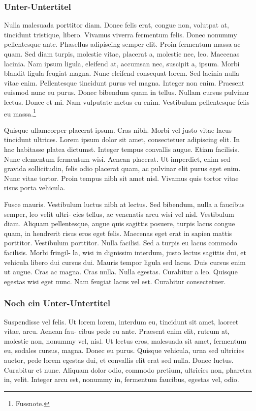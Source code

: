 \documentclass[ngerman]{uzhpub}
\begin{document}
\subsubsection{Unter-Untertitel}

Nulla malesuada porttitor diam. Donec felis erat, congue non, volutpat
at, tincidunt tristique, libero. Vivamus viverra fermentum felis.
Donec nonummy pellentesque ante. Phasellus adipiscing semper elit.
Proin fermentum massa ac quam. Sed diam turpis, molestie vitae, placerat
a, molestie nec, leo. Maecenas lacinia. Nam ipsum ligula, eleifend
at, accumsan nec, suscipit a, ipsum. Morbi blandit ligula feugiat
magna. Nunc eleifend consequat lorem. Sed lacinia nulla vitae enim.
Pellentesque tincidunt purus vel magna. Integer non enim. Praesent
euismod nunc eu purus. Donec bibendum quam in tellus. Nullam cursus
pulvinar lectus. Donec et mi. Nam vulputate metus eu enim. Vestibulum
pellentesque felis eu massa.\footnote{Fussnote.}

Quisque ullamcorper placerat ipsum. Cras nibh. Morbi vel justo vitae
lacus tincidunt ultrices. Lorem ipsum dolor sit amet, consectetuer
adipiscing elit. In hac habitasse platea dictumst. Integer tempus
convallis augue. Etiam facilisis. Nunc elementum fermentum wisi. Aenean
placerat. Ut imperdiet, enim sed gravida sollicitudin, felis odio
placerat quam, ac pulvinar elit purus eget enim. Nunc vitae tortor.
Proin tempus nibh sit amet nisl. Vivamus quis tortor vitae risus porta
vehicula. 

Fusce mauris. Vestibulum luctus nibh at lectus. Sed bibendum, nulla
a faucibus semper, leo velit ultri- cies tellus, ac venenatis arcu
wisi vel nisl. Vestibulum diam. Aliquam pellentesque, augue quis sagittis
posuere, turpis lacus congue quam, in hendrerit risus eros eget felis.
Maecenas eget erat in sapien mattis porttitor. Vestibulum porttitor.
Nulla facilisi. Sed a turpis eu lacus commodo facilisis. Morbi fringil-
la, wisi in dignissim interdum, justo lectus sagittis dui, et vehicula
libero dui cursus dui. Mauris tempor ligula sed lacus. Duis cursus
enim ut augue. Cras ac magna. Cras nulla. Nulla egestas. Curabitur
a leo. Quisque egestas wisi eget nunc. Nam feugiat lacus vel est.
Curabitur consectetuer.

\subsubsection{Noch ein Unter-Untertitel}

Suspendisse vel felis. Ut lorem lorem, interdum eu, tincidunt sit
amet, laoreet vitae, arcu. Aenean fau- cibus pede eu ante. Praesent
enim elit, rutrum at, molestie non, nonummy vel, nisl. Ut lectus eros,
malesuada sit amet, fermentum eu, sodales cursus, magna. Donec eu
purus. Quisque vehicula, urna sed ultricies auctor, pede lorem egestas
dui, et convallis elit erat sed nulla. Donec luctus. Curabitur et
nunc. Aliquam dolor odio, commodo pretium, ultricies non, pharetra
in, velit. Integer arcu est, nonummy in, fermentum faucibus, egestas
vel, odio. 
\end{document}
